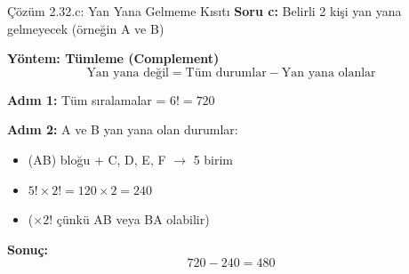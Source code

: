 \documentclass[light]{lutbeamer}
\begin{document}
\begin{frame}{Çözüm 2.32.c: Yan Yana Gelmeme Kısıtı}
    \color{blue}
    \textbf{Soru c:} Belirli 2 kişi yan yana gelmeyecek (örneğin A ve B)
    
    \vspace{0.3cm}
    \textbf{Yöntem: Tümleme (Complement)}
    \[ \text{Yan yana değil} = \text{Tüm durumlar} - \text{Yan yana olanlar} \]
    
    \vspace{0.3cm}
    \textbf{Adım 1:} Tüm sıralamalar = $6! = 720$
    
    \textbf{Adım 2:} A ve B yan yana olan durumlar:
    \begin{itemize}
        \item (AB) bloğu + C, D, E, F $\rightarrow$ 5 birim
        \item $5! \times 2! = 120 \times 2 = 240$
        \item ($\times 2!$ çünkü AB veya BA olabilir)
    \end{itemize}
    
    \vspace{0.3cm}
    \textbf{Sonuç:}
    \[ 720 - 240 = 480 \]
    
    \begin{center}
    \end{center}
\end{frame}

\end{document}
